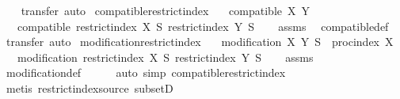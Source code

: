 \begin{isabellebody}
%
\isadelimproof
\ \ %
\endisadelimproof
%
\isatagproof
{}\isamarkupfalse%
\ {\isacharparenleft}{\kern0pt}transfer{\isacharcomma}{\kern0pt}\ auto{\isacharparenright}{\kern0pt}%
\endisatagproof
{\isafoldproof}%
%
\isadelimproof
\isanewline
%
\endisadelimproof
\isanewline
{}\isamarkupfalse%
\ compatible{\isacharunderscore}{\kern0pt}restrict{\isacharunderscore}{\kern0pt}index{\isacharcolon}{\kern0pt}\isanewline
\ \ \ {\isachardoublequoteopen}compatible\ X\ Y{\isachardoublequoteclose}\isanewline
\ \ \ {\isachardoublequoteopen}compatible\ {\isacharparenleft}{\kern0pt}restrict{\isacharunderscore}{\kern0pt}index\ X\ S{\isacharparenright}{\kern0pt}\ {\isacharparenleft}{\kern0pt}restrict{\isacharunderscore}{\kern0pt}index\ Y\ S{\isacharparenright}{\kern0pt}{\isachardoublequoteclose}\isanewline
%
\isadelimproof
\ \ %
\endisadelimproof
%
\isatagproof
{}\isamarkupfalse%
\ assms\ \isamarkupfalse%
\ compatible{\isacharunderscore}{\kern0pt}def\ \isamarkupfalse%
\ {\isacharparenleft}{\kern0pt}transfer{\isacharcomma}{\kern0pt}\ auto{\isacharparenright}{\kern0pt}%
\endisatagproof
{\isafoldproof}%
%
\isadelimproof
\isanewline
%
\endisadelimproof
\isanewline
{}\isamarkupfalse%
\ modification{\isacharunderscore}{\kern0pt}restrict{\isacharunderscore}{\kern0pt}index{\isacharcolon}{\kern0pt}\isanewline
\ \ \ {\isachardoublequoteopen}modification\ X\ Y{\isachardoublequoteclose}\ {\isachardoublequoteopen}S\ {\isasymsubseteq}\ proc{\isacharunderscore}{\kern0pt}index\ X{\isachardoublequoteclose}\isanewline
\ \ \ {\isachardoublequoteopen}modification\ {\isacharparenleft}{\kern0pt}restrict{\isacharunderscore}{\kern0pt}index\ X\ S{\isacharparenright}{\kern0pt}\ {\isacharparenleft}{\kern0pt}restrict{\isacharunderscore}{\kern0pt}index\ Y\ S{\isacharparenright}{\kern0pt}{\isachardoublequoteclose}\isanewline
%
\isadelimproof
\ \ %
\endisadelimproof
%
\isatagproof
{}\isamarkupfalse%
\ assms\ \isamarkupfalse%
\ modification{\isacharunderscore}{\kern0pt}def\isanewline
\ \ \ \ \isamarkupfalse%
\ {\isacharparenleft}{\kern0pt}auto\ simp{\isacharcolon}{\kern0pt}\ compatible{\isacharunderscore}{\kern0pt}restrict{\isacharunderscore}{\kern0pt}index{\isacharparenright}{\kern0pt}\isanewline
\ \ \ \ \isamarkupfalse%
\ {\isacharparenleft}{\kern0pt}metis\ restrict{\isacharunderscore}{\kern0pt}index{\isacharunderscore}{\kern0pt}source\ subsetD{\isacharparenright}{\kern0pt}\isanewline

\end{isabellebody}
